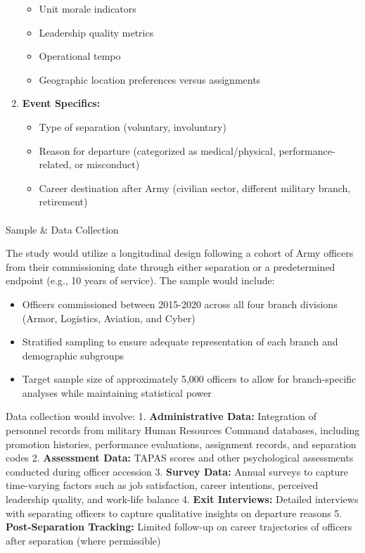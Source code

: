 \documentclass[
  letterpaper,
  DIV=11,
  numbers=noendperiod]{scrartcl}
\makeatletter
\let\oldparagraph\paragraph
\renewcommand{\paragraph}{
    \@ifstar
      \xxxParagraphStar
      \xxxParagraphNoStar
  }
\newcommand{\xxxParagraphStar}[1]{\oldparagraph*{#1}\mbox{}}
\newcommand{\xxxParagraphNoStar}[1]{\oldparagraph{#1}\mbox{}}
\providecommand{\tightlist}{%
  \setlength{\itemsep}{0pt}\setlength{\parskip}{0pt}}
\makeatother
\begin{document}
\begin{enumerate}
  \begin{itemize}
  \tightlist
  \item
    Unit morale indicators
  \item
    Leadership quality metrics
  \item
    Operational tempo
  \item
    Geographic location preferences versus assignments
  \end{itemize}
\item
  \textbf{Event Specifics:}

  \begin{itemize}
  \tightlist
  \item
    Type of separation (voluntary, involuntary)
  \item
    Reason for departure (categorized as medical/physical,
    performance-related, or misconduct)
  \item
    Career destination after Army (civilian sector, different military
    branch, retirement)
  \end{itemize}
\end{enumerate}

\paragraph{Sample \& Data Collection}\label{sample-data-collection}

The study would utilize a longitudinal design following a cohort of Army
officers from their commissioning date through either separation or a
predetermined endpoint (e.g., 10 years of service). The sample would
include:

\begin{itemize}
\tightlist
\item
  Officers commissioned between 2015-2020 across all four branch
  divisions (Armor, Logistics, Aviation, and Cyber)
\item
  Stratified sampling to ensure adequate representation of each branch
  and demographic subgroups
\item
  Target sample size of approximately 5,000 officers to allow for
  branch-specific analyses while maintaining statistical power
\end{itemize}

Data collection would involve: 1. \textbf{Administrative Data:}
Integration of personnel records from military Human Resources Command
databases, including promotion histories, performance evaluations,
assignment records, and separation codes 2. \textbf{Assessment Data:}
TAPAS scores and other psychological assessments conducted during
officer accession 3. \textbf{Survey Data:} Annual surveys to capture
time-varying factors such as job satisfaction, career intentions,
perceived leadership quality, and work-life balance 4. \textbf{Exit
Interviews:} Detailed interviews with separating officers to capture
qualitative insights on departure reasons 5. \textbf{Post-Separation
Tracking:} Limited follow-up on career trajectories of officers after
separation (where permissible)
\end{document}
